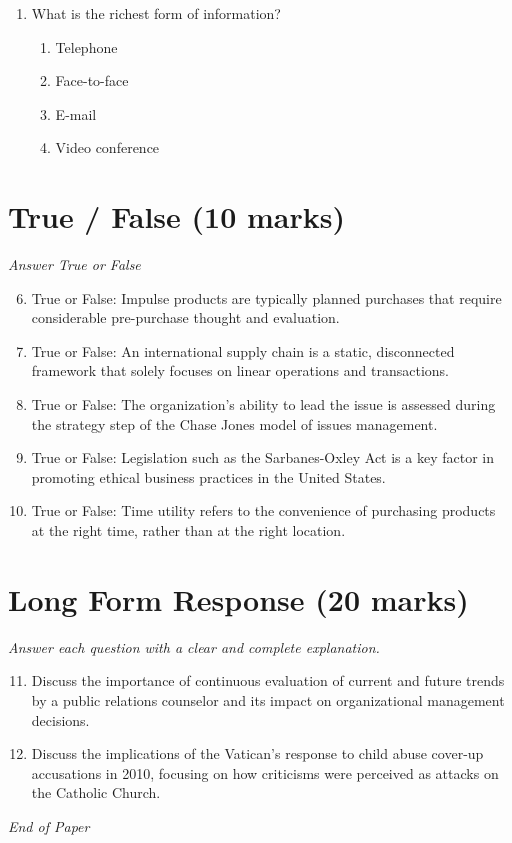 \documentclass[12pt]{article}
\begin{document}
\begin{enumerate}[label=\arabic*.]
\begin{enumerate}[label=(\alph*)]
    \item Social
    \item Business
    \item Organisational
    \item Company
\end{enumerate}
\item What is the richest form of information?
\begin{enumerate}[label=(\alph*)]
    \item Telephone
    \item Face-to-face
    \item E-mail
    \item Video conference
\end{enumerate}
\end{enumerate}

\section*{True / False (10 marks)}
\textit{Answer True or False}
\begin{enumerate}[label=\arabic*.]
\setcounter{enumi}{5}
\item True or False: Impulse products are typically planned purchases that require considerable pre-purchase thought and evaluation.
\item True or False: An international supply chain is a static, disconnected framework that solely focuses on linear operations and transactions.
\item True or False: The organization's ability to lead the issue is assessed during the strategy step of the Chase Jones model of issues management.
\item True or False: Legislation such as the Sarbanes-Oxley Act is a key factor in promoting ethical business practices in the United States.
\item True or False: Time utility refers to the convenience of purchasing products at the right time, rather than at the right location.
\end{enumerate}

\section*{Long Form Response (20 marks)}
\textit{Answer each question with a clear and complete explanation.}
\begin{enumerate}[label=\arabic*.]
\setcounter{enumi}{10}
\item Discuss the importance of continuous evaluation of current and future trends by a public relations counselor and its impact on organizational management decisions.
\item Discuss the implications of the Vatican's response to child abuse cover-up accusations in 2010, focusing on how criticisms were perceived as attacks on the Catholic Church.
\end{enumerate}

\vfill
\noindent\textit{End of Paper}
\end{document}
